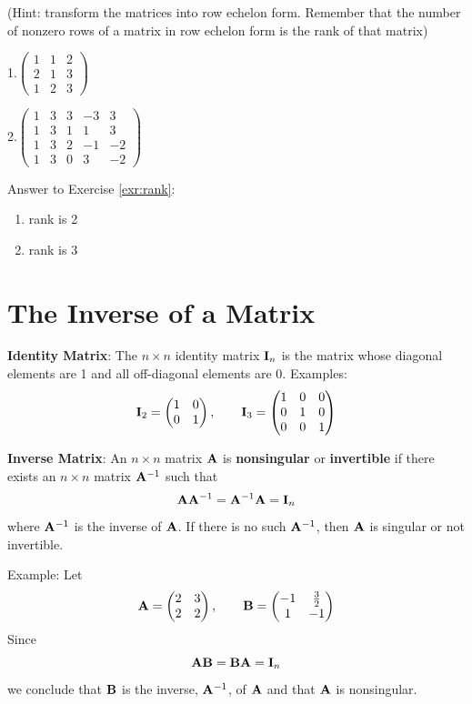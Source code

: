 \documentclass[]{book}
\theoremstyle{definition}
\theoremstyle{definition}
\theoremstyle{definition}
\theoremstyle{remark}
\begin{document}
(Hint: transform the matrices into row echelon form. Remember that the
number of nonzero rows of a matrix in row echelon form is the rank of
that matrix)

1.\(\begin{pmatrix} 1 & 1 & 2 \\ 2 & 1 & 3 \\ 1 & 2 & 3 \end{pmatrix}\)

\bigskip

2.\(\begin{pmatrix} 1 & 3 & 3 & -3 & 3\\ 1 & 3 & 1 & 1 & 3 \\ 1 & 3 & 2 & -1 & -2 \\ 1 & 3 & 0 & 3 & -2 \end{pmatrix}\)

Answer to Exercise \ref{exr:rank}:

\begin{enumerate}
\def\labelenumi{\arabic{enumi}.}
\item
  rank is 2
\item
  rank is 3
\end{enumerate}

\section{The Inverse of a Matrix}\label{the-inverse-of-a-matrix}

\textbf{Identity Matrix}: The \(n\times n\) identity matrix
\({\bf I}_n\) is the matrix whose diagonal elements are 1 and all
off-diagonal elements are 0. Examples:
\[ {\bf I}_2=\begin{pmatrix} 1&0\\0&1 \end{pmatrix}, \qquad {\bf I}_3=\begin{pmatrix} 1&0&0\\ 0&1&0\\ 
            0&0&1 \end{pmatrix}\]

\textbf{Inverse Matrix}: An \(n\times n\) matrix \({\bf A}\) is
\textbf{nonsingular} or \textbf{invertible} if there exists an
\(n\times n\) matrix \({\bf A}^{-1}\) such that
\[{\bf A} {\bf A}^{-1} = {\bf A}^{-1} {\bf A} = {\bf I}_n\] where
\({\bf A}^{-1}\) is the inverse of \({\bf A}\). If there is no such
\({\bf A}^{-1}\), then \({\bf A}\) is singular or not invertible.

Example: Let
\[{\bf A} = \begin{pmatrix} 2&3\\2&2 \end{pmatrix}, \qquad {\bf B}=\begin{pmatrix} -1&\frac{3}{2}\\ 1&-1
        \end{pmatrix}\] Since
\[{\bf A} {\bf B} = {\bf B} {\bf A} = {\bf I}_n\] we conclude that
\({\bf B}\) is the inverse, \({\bf A}^{-1}\), of \({\bf A}\) and that
\({\bf A}\) is nonsingular.
\end{document}
